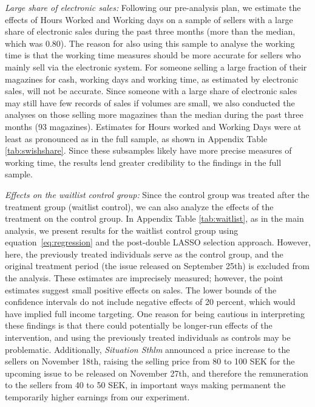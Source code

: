 \documentclass[12pt]{article}
\begin{document}
\textit{Large share of electronic sales:} Following our pre-analysis plan, we estimate the effects of Hours Worked and Working days on a sample of sellers with a large share of electronic sales during the past three months (more than the median, which was 0.80). The reason for also using this sample to analyse the working time is that the working time measures should be more accurate for sellers who mainly sell via the electronic system. For someone selling a large fraction of their magazines for cash, working days and working time, as estimated by electronic sales, will not be accurate. Since someone with a large share of electronic sales may still have few records of sales if volumes are small, we also conducted the analyses on those selling more magazines than the median during the past three months (93 magazines). Estimates for Hours worked and Working Days were at least as pronounced as in the full sample, as shown in Appendix Table \ref{tab:swishshare}. Since these subsamples likely have more precise measures of working time, the results lend greater credibility to the findings in the full sample.

\textit{Effects on the waitlist control group:} Since the control group was treated after the treatment group (waitlist control), we can also analyze the effects of the treatment on the control group. In Appendix Table \ref{tab:waitlist}, as in the main analysis, we present results for the waitlist control group using equation~\eqref{eq:regression} and the post-double LASSO selection approach. However, here, the previously treated individuals serve as the control group, and the original treatment period (the issue released on September 25th) is excluded from the analysis. These estimates are imprecisely measured; however, the point estimates suggest small positive effects on sales. The lower bounds of the confidence intervals do not include negative effects of 20 percent, which would have implied full income targeting. One reason for being cautious in interpreting these findings is that there could potentially be longer-run effects of the intervention, and using the previously treated individuals as controls may be problematic. Additionally, \textit{Situation Sthlm} announced a price increase to the sellers on November 18th, raising the selling price from 80 to 100 SEK for the upcoming issue to be released on November 27th, and therefore the remuneration to the sellers from 40 to 50 SEK, in important ways making permanent the temporarily higher earnings from our experiment.
\end{document}
